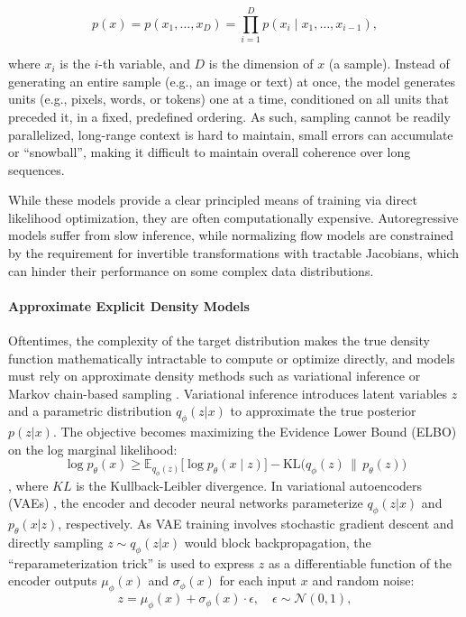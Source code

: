 \[
p(x) = p(x_1, \dots, x_D) 
= \prod_{i=1}^{D} p(x_i \mid x_1, \dots, x_{i-1}),
\] 

where $x_i$ is the $i$-th variable, and $D$ is the dimension of $x$ (a sample). Instead of generating an entire sample (e.g., an image or text) at once, the model generates units (e.g., pixels, words, or tokens) one at a time, conditioned on all units that preceded it, in a fixed, predefined ordering. As such, sampling cannot be readily parallelized, long-range context is hard to maintain, small errors can accumulate or “snowball”, making it difficult to maintain overall coherence over long sequences.   

While these models provide a clear principled means of training via direct likelihood optimization, they are often computationally expensive. Autoregressive models suffer from slow inference, while normalizing flow models are constrained by the requirement for invertible transformations with tractable Jacobians, which can hinder their performance on some complex data distributions.

\paragraph*{Approximate Explicit Density Models}
Oftentimes, the complexity of the target distribution makes the true density function mathematically intractable to compute or optimize directly, and models must rely on approximate density methods such as variational inference \cite{jordan1999introduction} or Markov chain-based sampling \cite{neal1993probabilistic}. Variational inference introduces latent variables $z$ and a parametric distribution $q_\phi(z|x)$ to approximate the true posterior $p(z|x)$. The objective becomes maximizing the Evidence Lower Bound (ELBO) on the log marginal likelihood: 
\[
\log p_\theta(x) \geq \mathbb{E}_{q_\phi(z)} \big[ \log p_\theta(x \mid z) \big] - \mathrm{KL}\big(q_\phi(z) \,\|\, p_\theta(z)\big)
\], 
where $KL$ is the Kullback-Leibler divergence. In variational autoencoders (VAEs) \cite{kingma2013auto}, the encoder and decoder neural networks parameterize \(q_\phi(z|x)\) and \(p_\theta(x|z)\), respectively. As VAE training involves stochastic gradient descent and directly sampling \(z \sim q_\phi(z|x)\) would block backpropagation, the “reparameterization trick”  is used to express \(z\) as a differentiable function of the encoder outputs $\mu_\phi(x)$ and $\sigma_\phi(x)$ for each input $x$ and random noise: 
\[
z = \mu_\phi(x) + \sigma_\phi(x) \cdot \epsilon, \quad \epsilon \sim \mathcal{N}(0,1),
\]

